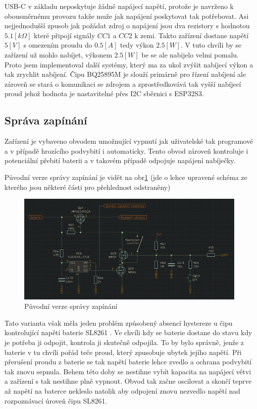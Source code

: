 USB-C v základu neposkytuje žádné napájecí napětí, protože je navrženo k obousměrnému provozu takže muže jak napájení poskytovat tak potřebovat.
Asi nejjednodušší zpusob jak požádat zdroj o napájení jsou dva rezistory s hodnotou \(5.1 [k\Omega]\) které připojí signály \(CC1\) a \(CC2\) k zemi.
Takto zařízení dostane napětí \(5 [V]\) s omezením proudu do \(0.5 [A]\) tedy výkon \(2.5 [W]\).
V tuto chvíli by se zařízení už mohlo nabíjet, výkonem \(2.5 [W]\) be se ale nabijelo velmi pomalu.
Proto jsem implementoval další systémy, který ma za ukol zvýšit nabíjecí výkon a tak zrychlit nabíjení.
Čipu BQ25895M \cite{BQ25895} je slouží primárně pro řízení nabíjení ale zároveň se stará o komunikaci se zdrojem a zprostředkovává tak vyšší nabíjecí proud jehož hodnota je nastavitelné přes I2C sběrnici s ESP32S3.

\subsection{Správa zapínání}
Zařízení je vybaveno obvodem umožnující vypnutí jak uživatelské tak programové a v případě hrozícího podvybití i automaticky.
Tento obvod zároveň kontroluje i potenciální přebití baterii a v takovém případě odpojuje napájení nabíječky.

Původní verze správy zapínání je vidět na obr\ref{fig:stary_PoverManager} (jde o lehce upravené schéma ze kterého jsou některé části pro přehlednost odstraněny) 
\begin{figure}[h!]
    \centering
    \includegraphics[width=\textwidth]{text/PraktickaCast/img/stary_power_manager.png}
    \caption{Původní verze správy zapínání}
    \label{fig:stary_PoverManager}
\end{figure}

Tato varianta však měla jeden problém způsobený absencí hystereze u čipu kontrolující napětí baterie SL8261 \cite{SL8261}.
Ve chvíli kdy se baterie dostane do stavu kdy je potřeba ji odpojit, kontrola ji skutečně odpojila.
To by bylo správně, jenže z baterie v tu chvíli pořád teče proud, který zpusobuje ubytek jejího napětí.
Při přerušení proudu z baterie se tak napětí baterie lehce zvedlo a ochrana podvybití tak znovu sepnula.
Behem této doby se nestihne vybít kapacita na napájecí větvi a zařízení s tak nestihne plně vypnout.
Obvod tak začne oscilovat a skončí teprve až napětí na baterce nekleslo natolik aby odpojení znovu nezvedlo napětí nad rozpoznávací úroveň čipu SL8261.


